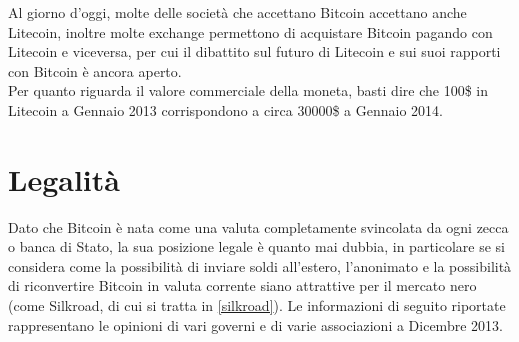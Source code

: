 Al giorno d'oggi, molte delle società che accettano Bitcoin accettano anche Litecoin, inoltre molte exchange permettono di acquistare Bitcoin pagando con Litecoin e viceversa, per cui il dibattito sul futuro di Litecoin e sui suoi rapporti con Bitcoin è ancora aperto.\\

Per quanto riguarda il valore commerciale della moneta, basti dire che 100\$ in Litecoin a Gennaio 2013 corrispondono a circa 30000\$ a Gennaio 2014.

\section{Legalità}

Dato che Bitcoin è nata come una valuta completamente svincolata da ogni zecca o banca di Stato, la sua posizione legale è quanto mai dubbia, in particolare se si considera come la possibilità di inviare soldi all'estero, l'anonimato e la possibilità di riconvertire Bitcoin in valuta corrente siano attrattive per il mercato nero (come Silkroad, di cui si tratta in \ref{silkroad}). Le informazioni di seguito riportate rappresentano le opinioni di vari governi e di varie associazioni a Dicembre 2013.
